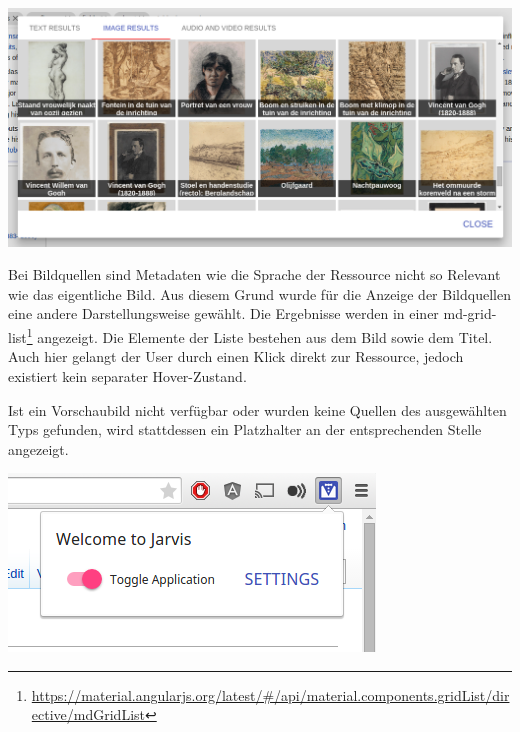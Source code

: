  \begin{minipage}{\linewidth}
	\centering
	\vspace*{0.5cm}
	\includegraphics[width=\linewidth]{Bilder/app-screenshots/image-results.png}
	\label{fig:imageResults}
	\vspace*{0.5cm}
 \end{minipage}

 Bei Bildquellen sind Metadaten wie die Sprache der Ressource nicht so Relevant wie das eigentliche Bild. Aus diesem Grund wurde für die Anzeige der Bildquellen eine andere Darstellungsweise gewählt. Die Ergebnisse werden in einer md-grid-list\footnote{\url{https://material.angularjs.org/latest/\#/api/material.components.gridList/directive/mdGridList}} angezeigt. Die Elemente der Liste bestehen aus dem Bild sowie dem Titel. Auch hier gelangt der User durch einen Klick direkt zur Ressource, jedoch existiert kein separater Hover-Zustand.

 Ist ein Vorschaubild nicht verfügbar oder wurden keine Quellen des ausgewählten Typs gefunden, wird stattdessen ein Platzhalter an der entsprechenden Stelle angezeigt.

 \begin{minipage}{\linewidth}
	\centering
	\vspace*{0.5cm}
	\includegraphics[scale=0.6]{Bilder/app-screenshots/popup.png}
	\label{fig:popup}
	\vspace*{0.5cm}
 \end{minipage}

